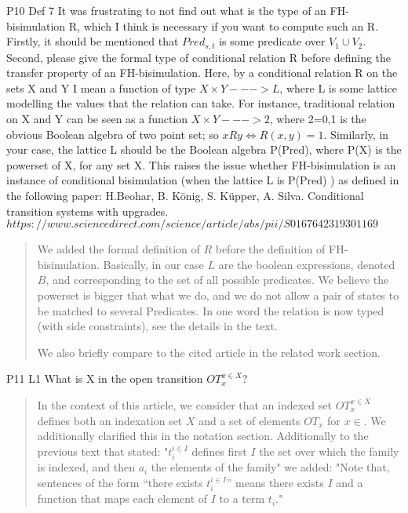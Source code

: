 \documentclass{article}
\begin{document}
P10 Def 7 It was frustrating to not find out what is the type of an FH-bisimulation R, which I think is necessary if you want to compute such an R. Firstly, it should be mentioned that $Pred_{s,t}$ is some predicate over $V_1 \cup V_2$. Second, please give the formal type of conditional relation R before defining the transfer property of an FH-bisimulation. Here, by a conditional relation R on the sets X and Y I mean a function of type $X \times Y ---> L$, where L is some lattice modelling the values that the relation can take. For instance, traditional relation on X and Y can be seen as a function $X \times Y ---> 2$, where 2={0,1} is the obvious Boolean algebra of two point set; so $x R y \iff R(x,y)=1$. Similarly, in your case, the lattice L should be the Boolean algebra P(Pred), where P(X) is the powerset of X, for any set X.
This raises the issue whether FH-bisimulation is an instance of conditional bisimulation (when the lattice L is P(Pred) ) as defined in the following paper:
H.Beohar, B. König, S. Küpper,  A. Silva. Conditional transition systems with upgrades. $https://www.sciencedirect.com/science/article/abs/pii/S0167642319301169$

\begin{quote}
We added the formal definition of $R$  before the definition of FH-bisimulation. Basically, in our case $L$ are the boolean expressions, denoted $B$, and corresponding to the set of all possible predicates. We believe the powerset is bigger that what we do, and we do not allow a pair of states to be matched to several Predicates. In one word the relation is now typed (with side constraints), see the details in the text.

We also briefly compare to the cited article in the related work section.

\end{quote}

P11 L1 What is X in the open transition $OT_x^{x\in X}$?
\begin{quote}
In the context of this article, we consider that an indexed set $OT_x^{x\in X}$ defines both an indexation set $X$ and a set of elements $OT_x$ for $x\in $. We additionally clarified this in the notation section. Additionally to the previous text that stated:
"$t_i^{i\in I}$ defines first $I$ the set over which the family is indexed, and then $a_i$ the elements of the family"
we added:
"Note that, sentences of the form ``there exists $t_i^{i\in I}$'' means there exists $I$ and a function that maps each element of $I$ to a term $t_i$."
\end{quote}
\end{document}
